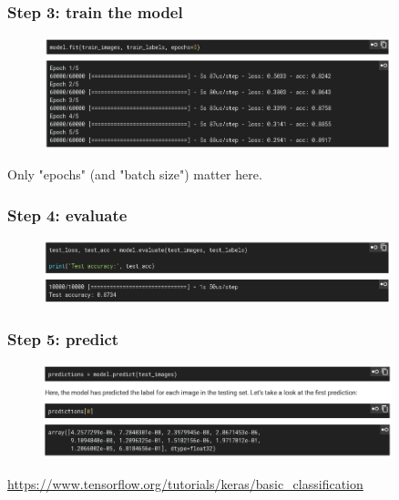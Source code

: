 \begin{frame}
        \frametitle{Step 3: train the model}

	 \begin{figure}
                \includegraphics[width=0.9\textwidth]{Pics/train.png}
        \end{figure}

	Only "epochs" (and "batch size") matter here.

\end{frame}

\begin{frame}
	\frametitle{Step 4: evaluate}

	\begin{figure}
                \includegraphics[width=0.9\textwidth]{Pics/evaluate.png}
        \end{figure}

\end{frame}

\begin{frame}
	\frametitle{Step 5: predict}

	\begin{figure}
                \includegraphics[width=0.9\textwidth]{Pics/predict.png}
        \end{figure}

	\url{https://www.tensorflow.org/tutorials/keras/basic_classification}

\end{frame}

